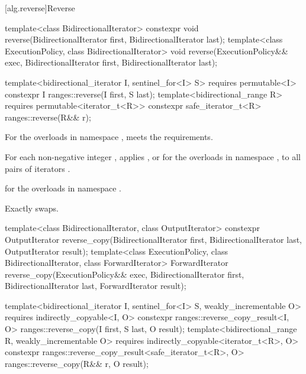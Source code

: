 [alg.reverse]{Reverse}

%
\begin{itemdecl}
template<class BidirectionalIterator>
  constexpr void reverse(BidirectionalIterator first, BidirectionalIterator last);
template<class ExecutionPolicy, class BidirectionalIterator>
  void reverse(ExecutionPolicy&& exec,
               BidirectionalIterator first, BidirectionalIterator last);

template<bidirectional_iterator I, sentinel_for<I> S>
  requires permutable<I>
  constexpr I ranges::reverse(I first, S last);
template<bidirectional_range R>
  requires permutable<iterator_t<R>>
  constexpr safe_iterator_t<R> ranges::reverse(R&& r);
\end{itemdecl}

\begin{itemdescr}
\pnum
\expects
For the overloads in namespace ,
 meets
the  requirements.

\pnum
\effects
For each non-negative integer ,
applies , or
 for the overloads in namespace ,
to all pairs of iterators .

\pnum
\returns
{} for the overloads in namespace .

\pnum
\complexity
Exactly  swaps.
\end{itemdescr}

%
\begin{itemdecl}
template<class BidirectionalIterator, class OutputIterator>
  constexpr OutputIterator
    reverse_copy(BidirectionalIterator first, BidirectionalIterator last,
                 OutputIterator result);
template<class ExecutionPolicy, class BidirectionalIterator, class ForwardIterator>
  ForwardIterator
    reverse_copy(ExecutionPolicy&& exec,
                 BidirectionalIterator first, BidirectionalIterator last,
                 ForwardIterator result);

template<bidirectional_iterator I, sentinel_for<I> S, weakly_incrementable O>
  requires indirectly_copyable<I, O>
  constexpr ranges::reverse_copy_result<I, O>
    ranges::reverse_copy(I first, S last, O result);
template<bidirectional_range R, weakly_incrementable O>
  requires indirectly_copyable<iterator_t<R>, O>
  constexpr ranges::reverse_copy_result<safe_iterator_t<R>, O>
    ranges::reverse_copy(R&& r, O result);
\end{itemdecl}

